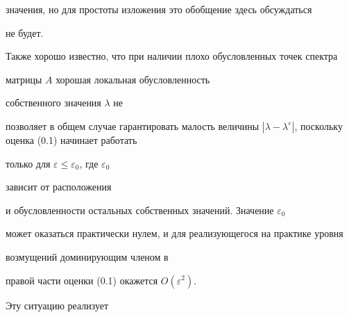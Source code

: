 значения, но для простоты изложения это обобщение здесь обсуждаться


не будет.





Также хорошо известно, что при наличии плохо обусловленных точек спектра


матрицы $A$ хорошая локальная обусловленность 


собственного значения $\lambda$ не


позволяет в общем случае гарантировать малость величины $|\lambda-


\lambda^\varepsilon|$, поскольку оценка (0.1) начинает работать


только для $\varepsilon\le\varepsilon_0$, где $\varepsilon_0$


зависит от расположения


и обусловленности остальных собственных значений. Значение $\varepsilon_0$


может оказаться практически нулем, и для реализующегося на практике уровня


возмущений доминирующим членом в


правой части оценки (0.1) окажется $O(\varepsilon^2)$.


Эту ситуацию реализует





